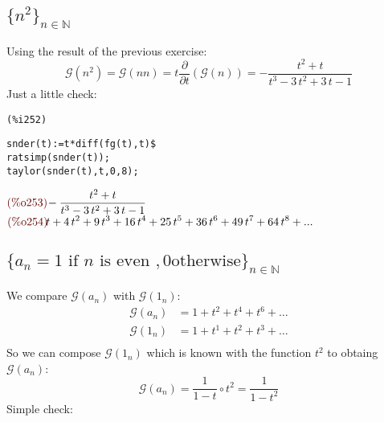 \subsection{$\{n^2\}_{n\in \mathbb{N} }$}
Using the result of the previous exercise:
\begin{displaymath}
  \mathcal{G} (n^2) = \mathcal{G} (n n) = t
  \frac{\partial}{\partial t}\left( \mathcal{G} (n) \right) = 
  -\frac{{t}^{2}+t}{{t}^{3}-3\,{t}^{2}+3\,t-1}
\end{displaymath}
Just a little check:\\
\noindent
\begin{minipage}[t]{8ex}{\color{red}\bf
\begin{verbatim}
(%i252) 
\end{verbatim}}
\end{minipage}
\begin{minipage}[t]{\textwidth}{\color{blue}
\begin{verbatim}
snder(t):=t*diff(fg(t),t)$
ratsimp(snder(t));
taylor(snder(t),t,0,8);
\end{verbatim}}
\end{minipage}
\begin{math}\displaystyle
\parbox{8ex}{\color{labelcolor}(\%o253) }
-\frac{{t}^{2}+t}{{t}^{3}-3\,{t}^{2}+3\,t-1}
\end{math}\\
\begin{math}\displaystyle
\parbox{8ex}{\color{labelcolor}(\%o254) }
t+4\,{t}^{2}+9\,{t}^{3}+16\,{t}^{4}+25\,{t}^{5}+36\,{t}^{6}+49\,{t}^{7}+64\,{t}^{8}+...
\end{math}

\subsection{$\{a_n = 1 \text{ if } n \text{ is even }, 0 \text{
    otherwise}\}_{n\in \mathbb{N} }$}

We compare $\mathcal{G}(a_n) $ with $\mathcal{G} (1_n)$:
\begin{displaymath}
  \begin{split}
    \mathcal{G} (a_n) &= 1 + t^2 + t^4 + t^6 + \ldots \\
    \mathcal{G} (1_n) &= 1 + t^1 + t^2 + t^3 + \ldots \\
  \end{split}
\end{displaymath}
So we can compose $\mathcal{G} (1_n)$ which is known with the function
$t^2$ to obtaing $\mathcal{G} (a_n)$:
\begin{displaymath}
  \mathcal{G} (a_n) =  \frac{1}{1-t} \circ t^2 =  \frac{1}{1-t^2} 
\end{displaymath}
Simple check:

